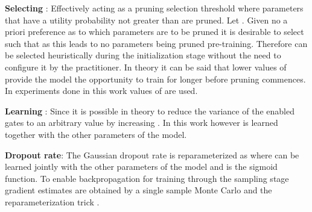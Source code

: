 \documentclass[final,1p,times]{elsarticle}
\begin{document}
\textbf{Selecting }: Effectively acting as a pruning selection threshold where parameters that have a utility probability not greater than  are pruned. Let . Given no a priori preference as to which parameters are to be pruned it is desirable to select  such that  as this leads to no parameters being pruned pre-training. Therefore  can be selected heuristically during the initialization stage without the need to configure it by the practitioner. In theory it can be said that lower values of  provide the model the opportunity to train for longer before pruning commences. In experiments done in this work values of  are used. \newline

\textbf{Learning }: Since  it is possible in theory to reduce the variance of the enabled gates  to an arbitrary value by increasing . In this work however  is learned together with the other parameters of the model. \newline

\textbf{Dropout rate}: The Gaussian dropout rate is reparameterized as  where  can be learned jointly with the other parameters of the model and  is the sigmoid function. To enable backpropagation for training  through the sampling stage gradient estimates are obtained by a single sample Monte Carlo and the reparameterization trick \cite{Kingma2014, pmlr-v32-rezende14}.
\end{document}
